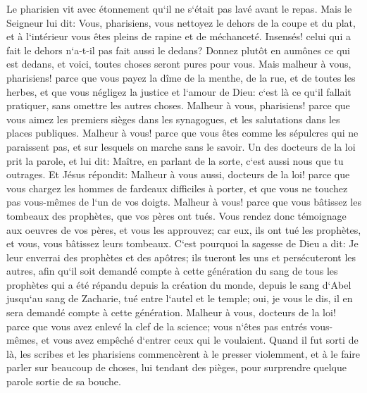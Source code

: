 \verse Le pharisien vit avec étonnement qu`il ne s`était pas lavé avant le repas. 
\verse Mais le Seigneur lui dit: Vous, pharisiens, vous nettoyez le dehors de la coupe et du plat, et à l`intérieur vous êtes pleins de rapine et de méchanceté. 
\verse Insensés! celui qui a fait le dehors n`a-t-il pas fait aussi le dedans? 
\verse Donnez plutôt en aumônes ce qui est dedans, et voici, toutes choses seront pures pour vous. 
\verse Mais malheur à vous, pharisiens! parce que vous payez la dîme de la menthe, de la rue, et de toutes les herbes, et que vous négligez la justice et l`amour de Dieu: c`est là ce qu`il fallait pratiquer, sans omettre les autres choses. 
\verse Malheur à vous, pharisiens! parce que vous aimez les premiers sièges dans les synagogues, et les salutations dans les places publiques. 
\verse Malheur à vous! parce que vous êtes comme les sépulcres qui ne paraissent pas, et sur lesquels on marche sans le savoir. 
\verse Un des docteurs de la loi prit la parole, et lui dit: Maître, en parlant de la sorte, c`est aussi nous que tu outrages. 
\verse Et Jésus répondit: Malheur à vous aussi, docteurs de la loi! parce que vous chargez les hommes de fardeaux difficiles à porter, et que vous ne touchez pas vous-mêmes de l`un de vos doigts. 
\verse Malheur à vous! parce que vous bâtissez les tombeaux des prophètes, que vos pères ont tués. 
\verse Vous rendez donc témoignage aux oeuvres de vos pères, et vous les approuvez; car eux, ils ont tué les prophètes, et vous, vous bâtissez leurs tombeaux. 
\verse C`est pourquoi la sagesse de Dieu a dit: Je leur enverrai des prophètes et des apôtres; ils tueront les uns et persécuteront les autres, 
\verse afin qu`il soit demandé compte à cette génération du sang de tous les prophètes qui a été répandu depuis la création du monde, 
\verse depuis le sang d`Abel jusqu`au sang de Zacharie, tué entre l`autel et le temple; oui, je vous le dis, il en sera demandé compte à cette génération. 
\verse Malheur à vous, docteurs de la loi! parce que vous avez enlevé la clef de la science; vous n`êtes pas entrés vous-mêmes, et vous avez empêché d`entrer ceux qui le voulaient. 
\verse Quand il fut sorti de là, les scribes et les pharisiens commencèrent à le presser violemment, et à le faire parler sur beaucoup de choses, 
\verse lui tendant des pièges, pour surprendre quelque parole sortie de sa bouche. 

